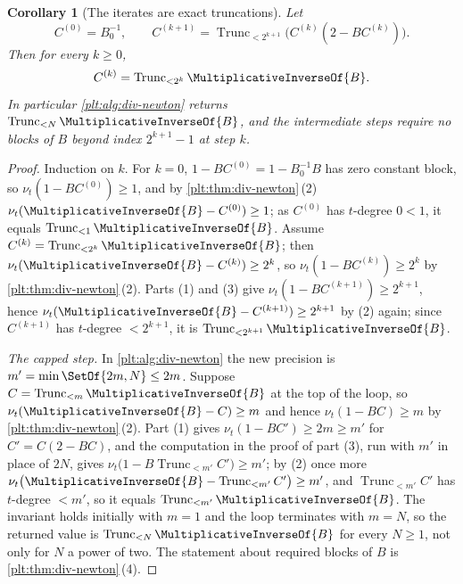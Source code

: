\documentclass[11pt,oneside]{article}
\theoremstyle{plain}
\newtheorem{corollary}[theorem]{Corollary}
\theoremstyle{definition}
\theoremstyle{remark}
\newcommand{\ordt}{\nu_{t}}                              %
\newcommand{\Trunc}[2]{\operatorname{Trunc}_{<#2}#1}     %
\newcommand{\recip}[1]{\MultiplicativeInverseOf{#1}}
\begin{document}
\begin{corollary}[The iterates are exact truncations]
\label{plt:cor:div-newton-exact}
Let
\[
  C^{(0)}=B_{0}^{-1},
  \qquad
  C^{(k+1)}=\Trunc{\bigl(C^{(k)}(2-BC^{(k)})\bigr)}{2^{k+1}} .
\]
Then for every \(k\ge0\),
\begin{equation}\label{plt:eq:div-newton-exact}
  C^{(k)}=\Trunc{\recip{B}}{2^{k}} .
\end{equation}
In particular \cref{plt:alg:div-newton} returns \(\Trunc{\recip{B}}{N}\), and
the intermediate steps require no blocks of \(B\) beyond index \(2^{k+1}-1\)
at step \(k\).
\end{corollary}

\begin{proof}
Induction on \(k\).  For \(k=0\), \(1-BC^{(0)}=1-B_{0}^{-1}B\) has zero
constant block, so \(\ordt(1-BC^{(0)})\ge1\), and by
\cref{plt:thm:div-newton}\,(2) \(\ordt(\recip{B}-C^{(0)})\ge1\); as
\(C^{(0)}\) has \(t\)-degree \(0<1\), it equals \(\Trunc{\recip{B}}{1}\).
Assume \(C^{(k)}=\Trunc{\recip{B}}{2^{k}}\); then
\(\ordt(\recip{B}-C^{(k)})\ge2^{k}\), so \(\ordt(1-BC^{(k)})\ge2^{k}\) by
\cref{plt:thm:div-newton}\,(2).  Parts (1) and (3) give
\(\ordt(1-BC^{(k+1)})\ge2^{k+1}\), hence
\(\ordt(\recip{B}-C^{(k+1)})\ge2^{k+1}\) by (2) again; since \(C^{(k+1)}\) has
\(t\)-degree \(<2^{k+1}\), it is \(\Trunc{\recip{B}}{2^{k+1}}\).

\emph{The capped step.}  In \cref{plt:alg:div-newton} the new precision is
\(m'=\min\SetOf{2m,N}\le2m\).  Suppose \(C=\Trunc{\recip{B}}{m}\) at the top of
the loop, so \(\ordt(\recip{B}-C)\ge m\) and hence \(\ordt(1-BC)\ge m\) by
\cref{plt:thm:div-newton}\,(2).  Part (1) gives \(\ordt(1-BC')\ge2m\ge m'\) for
\(C'=C(2-BC)\), and the computation in the proof of part (3), run with \(m'\)
in place of \(2N\), gives \(\ordt\bigl(1-B\Trunc{C'}{m'}\bigr)\ge m'\); by (2)
once more \(\ordt\bigl(\recip{B}-\Trunc{C'}{m'}\bigr)\ge m'\), and
\(\Trunc{C'}{m'}\) has \(t\)-degree \(<m'\), so it equals
\(\Trunc{\recip{B}}{m'}\).  The invariant holds initially with \(m=1\) and the
loop terminates with \(m=N\), so the returned value is
\(\Trunc{\recip{B}}{N}\) for every \(N\ge1\), not only for \(N\) a power of
two.  The statement about required blocks of \(B\) is
\cref{plt:thm:div-newton}\,(4).
\end{proof}
\end{document}

